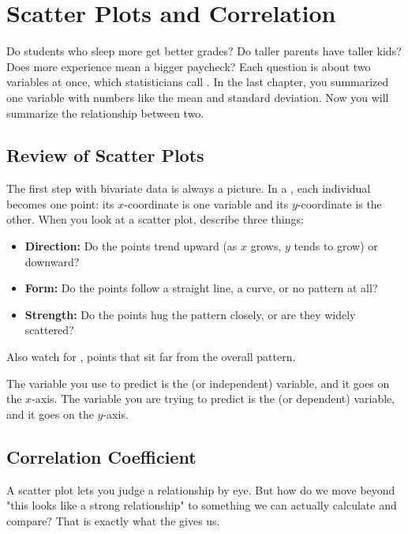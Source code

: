 \chapter{Scatter Plots and Correlation}

Do students who sleep more get better grades? Do taller parents have
taller kids? Does more experience mean a bigger paycheck? Each question is
about two variables at once, which statisticians call . In the last chapter, you summarized one variable with numbers like
the mean and standard deviation. Now you will summarize the relationship
between two.

\section{Review of Scatter Plots}

The first step with bivariate data is always a picture. In a
, each individual becomes one
point: its $x$-coordinate is one variable and its $y$-coordinate is the
other. When you look at a scatter plot, describe three things:
\begin{itemize}
\item \textbf{Direction:} Do the points trend upward (as $x$ grows, $y$
      tends to grow) or downward?
\item \textbf{Form:} Do the points follow a straight line, a curve, or no
      pattern at all?
\item \textbf{Strength:} Do the points hug the pattern closely, or are they
      widely scattered?
\end{itemize}
Also watch for , points that sit far from the overall
pattern.

The variable you use to predict is the  (or
independent) variable, and it goes on the $x$-axis. The variable you are
trying to predict is the  (or dependent) variable, and it
goes on the $y$-axis.

\section{Correlation Coefficient}

A scatter plot lets you judge a relationship by eye. But how do we move beyond "this looks like a
strong relationship" to something we can actually calculate and compare?
That is exactly what the  gives us.

